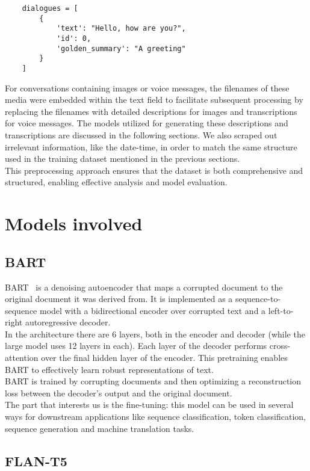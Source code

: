 \documentclass[10pt,twocolumn,letterpaper]{article}
\begin{document}
\begin{lstlisting}
    dialogues = [
        {
            'text': "Hello, how are you?",
            'id': 0,
            'golden_summary': "A greeting"
        }
    ]
\end{lstlisting}
For conversations containing images or voice messages, the filenames of these media were embedded within the text field to facilitate subsequent processing by replacing the filenames with detailed descriptions for images and transcriptions for voice messages. 
The models utilized for generating these descriptions and transcriptions are discussed in the following sections.
We also scraped out irrelevant information, like the date-time, in order to match the same structure used in the training dataset mentioned in the previous sections. \\
This preprocessing approach ensures that the dataset is both comprehensive and structured, enabling effective analysis and model evaluation.

\section{Models involved}

\subsection{BART}

BART~\cite{lewis2019bart} is a denoising autoencoder that maps a corrupted document to the original document it was derived from. It is implemented as a sequence-to-sequence model with a bidirectional encoder over 
corrupted text and a left-to-right autoregressive decoder. \\
In the architecture there are 6 layers, both in the encoder and decoder (while the large model uses 12 layers in each). Each layer of the decoder performs cross-attention over the final hidden layer of the 
encoder. This pretraining enables BART to effectively learn robust representations of text.\\
BART is trained by corrupting documents and then optimizing a reconstruction loss between the decoder's output and the original document. \\
The part that interests us is the fine-tuning: this model can be used in several ways for downstream applications like sequence classification, token classification, sequence generation and machine translation tasks. 

\subsection{FLAN-T5}
\end{document}
